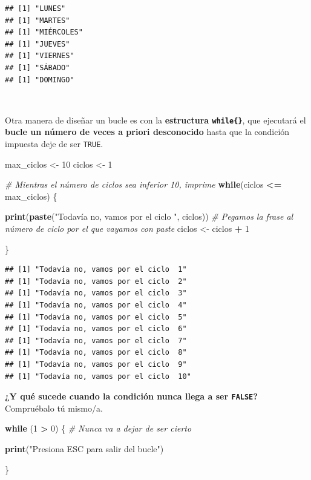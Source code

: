 \documentclass[11pt,]{book}
\newenvironment{Shaded}{\begin{snugshade}}{\end{snugshade}}
\newcommand{\CommentTok}[1]{\textcolor[rgb]{0.37,0.37,0.37}{\textit{#1}}}
\newcommand{\ControlFlowTok}[1]{\textcolor[rgb]{0.27,0.27,0.27}{\textbf{#1}}}
\newcommand{\DecValTok}[1]{\textcolor[rgb]{0.06,0.06,0.06}{#1}}
\newcommand{\KeywordTok}[1]{\textcolor[rgb]{0.27,0.27,0.27}{\textbf{#1}}}
\newcommand{\NormalTok}[1]{#1}
\newcommand{\OperatorTok}[1]{\textcolor[rgb]{0.43,0.43,0.43}{\textbf{#1}}}
\newcommand{\StringTok}[1]{\textcolor[rgb]{0.5,0.5,0.5}{#1}}
\begin{document}
\begin{verbatim}
## [1] "LUNES"
## [1] "MARTES"
## [1] "MIÉRCOLES"
## [1] "JUEVES"
## [1] "VIERNES"
## [1] "SÁBADO"
## [1] "DOMINGO"
\end{verbatim}

~

Otra manera de diseñar un bucle es con la \textbf{estructura \texttt{while\{\}}}, que ejecutará el \textbf{bucle un número de veces a priori desconocido} hasta que la condición impuesta deje de ser \texttt{TRUE}.

\begin{Shaded}
\begin{Highlighting}[]
\NormalTok{max_ciclos <-}\StringTok{ }\DecValTok{10}
\NormalTok{ciclos <-}\StringTok{ }\DecValTok{1}

\CommentTok{# Mientras el número de ciclos sea inferior 10, imprime}
\ControlFlowTok{while}\NormalTok{(ciclos }\OperatorTok{<=}\StringTok{ }\NormalTok{max_ciclos) \{}
  
  \KeywordTok{print}\NormalTok{(}\KeywordTok{paste}\NormalTok{(}\StringTok{"Todavía no, vamos por el ciclo "}\NormalTok{, ciclos)) }\CommentTok{# Pegamos la frase al número de ciclo por el que vayamos con paste}
\NormalTok{  ciclos <-}\StringTok{ }\NormalTok{ciclos }\OperatorTok{+}\StringTok{ }\DecValTok{1}
  
\NormalTok{\}}
\end{Highlighting}
\end{Shaded}

\begin{verbatim}
## [1] "Todavía no, vamos por el ciclo  1"
## [1] "Todavía no, vamos por el ciclo  2"
## [1] "Todavía no, vamos por el ciclo  3"
## [1] "Todavía no, vamos por el ciclo  4"
## [1] "Todavía no, vamos por el ciclo  5"
## [1] "Todavía no, vamos por el ciclo  6"
## [1] "Todavía no, vamos por el ciclo  7"
## [1] "Todavía no, vamos por el ciclo  8"
## [1] "Todavía no, vamos por el ciclo  9"
## [1] "Todavía no, vamos por el ciclo  10"
\end{verbatim}

\textbf{¿Y qué sucede cuando la condición nunca llega a ser \texttt{FALSE}?} Compruébalo tú mismo/a.

\begin{Shaded}
\begin{Highlighting}[]
\ControlFlowTok{while}\NormalTok{ (}\DecValTok{1} \OperatorTok{>}\StringTok{ }\DecValTok{0}\NormalTok{) \{ }\CommentTok{# Nunca va a dejar de ser cierto}
  
  \KeywordTok{print}\NormalTok{(}\StringTok{"Presiona ESC para salir del bucle"}\NormalTok{)}
  
\NormalTok{\}}
\end{Highlighting}
\end{Shaded}
\end{document}
